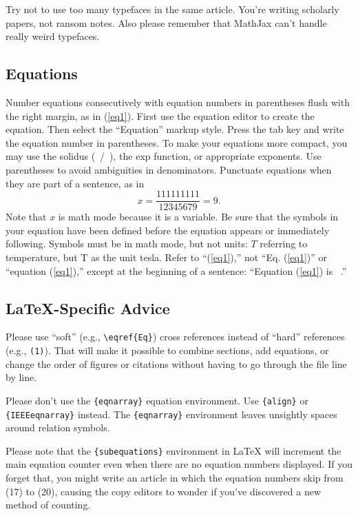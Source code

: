 \documentclass{IEEEtran}
\begin{document}
Try not to use too many typefaces in the same article. You're writing
scholarly papers, not ransom notes. Also please remember that MathJax
can't handle really weird typefaces.

\subsection{Equations}
Number equations consecutively with equation numbers in parentheses flush
with the right margin, as in (\ref{eq1}). First use the equation editor to create
the equation. Then select the ``Equation'' markup style. Press the tab key
and write the equation number in parentheses. To make your equations more
compact, you may use the solidus (~/~), the exp function, or appropriate
exponents. Use parentheses to avoid ambiguities in denominators. Punctuate
equations when they are part of a sentence, as in
\begin{equation}
\label{eq1}
x=\frac{111111111}{12345679}=9 .
\end{equation}
Note that $x$ is math mode because it is a variable. Be sure that the symbols
in your equation have been defined before the equation appears or
immediately following. Symbols must be in math mode, but not units: $T$ referring to
temperature, but T as the unit tesla. Refer to ``(\ref{eq1}),'' not ``Eq. (\ref{eq1})'' or
``equation (\ref{eq1}),'' except at the beginning of a sentence: ``Equation (\ref{eq1}) is
{\textellipsis}~.''

\subsection{\LaTeX-Specific Advice}

Please use ``soft'' (e.g., \verb|\eqref{Eq}|) cross references instead
of ``hard'' references (e.g., \verb|(1)|). That will make it possible
to combine sections, add equations, or change the order of figures or
citations without having to go through the file line by line.

Please don't use the \verb|{eqnarray}| equation environment. Use
\verb|{align}| or \verb|{IEEEeqnarray}| instead. The \verb|{eqnarray}|
environment leaves unsightly spaces around relation symbols.

Please note that the \verb|{subequations}| environment in {\LaTeX}
will increment the main equation counter even when there are no
equation numbers displayed. If you forget that, you might write an
article in which the equation numbers skip from (17) to (20), causing
the copy editors to wonder if you've discovered a new method of
counting.
\end{document}
